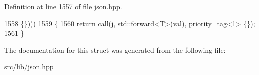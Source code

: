 Definition at line 1557 of file json.\+hpp.


\begin{DoxyCode}
1558                                                                                            \{\})))
1559     \{
1560         \textcolor{keywordflow}{return} \hyperlink{structnlohmann_1_1detail_1_1to__json__fn_ada2ce804ebf3b55f6e3e46ff3a055394}{call}(j, std::forward<T>(val), priority\_tag<1> \{\});
1561     \}
\end{DoxyCode}


The documentation for this struct was generated from the following file\+:\begin{DoxyCompactItemize}
\item 
src/lib/\hyperlink{json_8hpp}{json.\+hpp}\end{DoxyCompactItemize}
